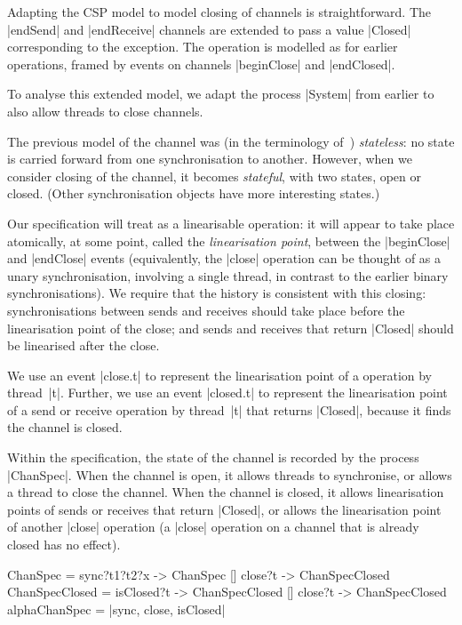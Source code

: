 
\inlineCSP

Adapting the CSP model to model closing of channels is straightforward.  The
|endSend| and |endReceive| channels are extended to pass a value |Closed|
corresponding to the  exception.  The  operation is
modelled as for earlier operations, framed by events on channels |beginClose|
and |endClosed|.


To analyse this extended model, we adapt the process |System| from earlier to
also allow threads to close channels.  

The previous model of the channel was (in the terminology
of~\cite{LL:synchronisation}) \emph{stateless}: no state is carried forward
from one synchronisation to another.  However, when we consider closing of the
channel, it becomes \emph{stateful}, with two states, open or closed.  (Other
synchronisation objects have more interesting states.)  

Our specification will treat  as a linearisable operation: it will
appear to take place atomically, at some point, called the \emph{linearisation
  point}, between the |beginClose| and |endClose| events (equivalently, the
|close| operation can be thought of as a unary synchronisation, involving a
single thread, in contrast to the earlier binary synchronisations).  We
require that the history is consistent with this closing: synchronisations
between sends and receives should take place before the linearisation point of
the close; and sends and receives that return |Closed| should be linearised
after the close.

We use an event |close.t| to represent the linearisation point of a
 operation by thread~|t|.  Further, we use an event |closed.t| to
represent the linearisation point of a send or receive operation by thread~|t|
that returns |Closed|, because it finds the channel is closed.

Within the specification, the state of the channel is recorded by the process
|ChanSpec|.  When the channel is open, it allows threads to synchronise, or
allows a thread to close the channel.  When the channel is closed, it allows
linearisation points of sends or receives that return |Closed|, or allows the
linearisation point of another |close| operation (a |close| operation on a
channel that is already closed has no effect).
%
\begin{cspm}
ChanSpec = sync?t1?t2?x -> ChanSpec [] close?t -> ChanSpecClosed
ChanSpecClosed = isClosed?t -> ChanSpecClosed [] close?t -> ChanSpecClosed
alphaChanSpec = {|sync, close, isClosed|} 
\end{cspm}


